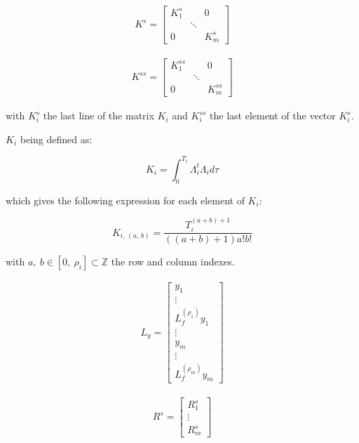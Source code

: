 \documentclass[letterpaper, 10 pt, conference]{ieeeconf}  %
\begin{document}
\begin{eqnarray}
K^{s} = 
\left[\begin{array}{ccc}
K^{s}_1 & & 0\\
& \ddots &\\
0 & & K^{s}_m
\end{array}\right]
\end{eqnarray}

\begin{eqnarray}
K^{ss} = 
\left[
\begin{array}{ccc}
K^{ss}_1 & & 0\\
& \ddots &\\
0 & & K^{ss}_m
\end{array}\right]
\end{eqnarray}

with $K^{s}_i$ the last line of the matrix $K_i$ and $K^{ss}_i$ the last element of the vector $K^{s}_i$. 

$K_i$ being defined as:


\begin{equation*}
K_i = \int^{T_i}_0\Lambda_i^t\Lambda_id\tau  
\end{equation*}

which gives the following expression for each element of $K_i$:

\begin{equation*}
K_{i,\,(a,\,b)} = \frac{T_i^{(a+b)+1}}{((a+b)+1)a!b!}
\end{equation*}

with ${a,\ b \in [0,\ \rho_i] \subset \mathds{Z}}$ the row and column indexes.

\begin{eqnarray}
L_y = 
\left[\begin{array}{c}
y_1\\
\vdots\\
L_f^{(\rho_1)}y_1\\
\vdots\\
y_m\\
\vdots\\
L_f^{(\rho_m)}y_m
\end{array}\right]
\end{eqnarray}

\begin{eqnarray}
R^s = 
\left[\begin{array}{c}
R_1^s\\
\vdots\\
R_m^s
\end{array}\right]
\end{eqnarray}
\end{document}
